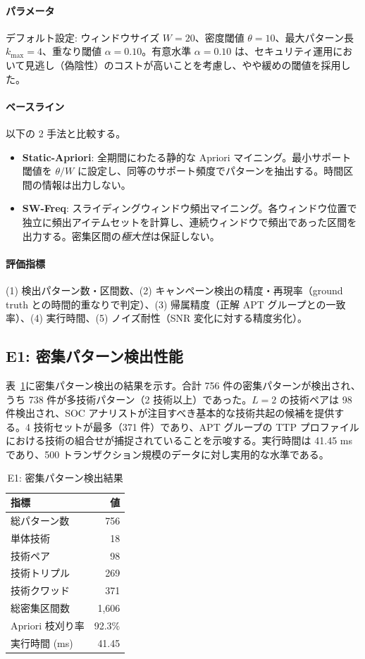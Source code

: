 \documentclass[11pt]{article}
\begin{document}
\paragraph{パラメータ}
デフォルト設定: ウィンドウサイズ $W = 20$、密度閾値 $\theta = 10$、最大パターン長 $k_{\max} = 4$、重なり閾値 $\alpha = 0.10$。有意水準 $\alpha = 0.10$ は、セキュリティ運用において見逃し（偽陰性）のコストが高いことを考慮し、やや緩めの閾値を採用した。

\paragraph{ベースライン}
以下の 2 手法と比較する。
\begin{itemize}
    \item \textbf{Static-Apriori}: 全期間にわたる静的な Apriori マイニング。最小サポート閾値を $\theta / W$ に設定し、同等のサポート頻度でパターンを抽出する。時間区間の情報は出力しない。
    \item \textbf{SW-Freq}: スライディングウィンドウ頻出マイニング。各ウィンドウ位置で独立に頻出アイテムセットを計算し、連続ウィンドウで頻出であった区間を出力する。密集区間の\emph{極大性}は保証しない。
\end{itemize}

\paragraph{評価指標}
(1) 検出パターン数・区間数、(2) キャンペーン検出の精度・再現率（ground truth との時間的重なりで判定）、(3) 帰属精度（正解 APT グループとの一致率）、(4) 実行時間、(5) ノイズ耐性（SNR 変化に対する精度劣化）。

\subsection{E1: 密集パターン検出性能}

表~\ref{tab:e1}に密集パターン検出の結果を示す。合計 756 件の密集パターンが検出され、うち 738 件が多技術パターン（2 技術以上）であった。$L=2$ の技術ペアは 98 件検出され、SOC アナリストが注目すべき基本的な技術共起の候補を提供する。4 技術セットが最多（371 件）であり、APT グループの TTP プロファイルにおける技術の組合せが捕捉されていることを示唆する。実行時間は 41.45 ms であり、500 トランザクション規模のデータに対し実用的な水準である。

\begin{table}[t]
\centering
\caption{E1: 密集パターン検出結果}
\label{tab:e1}
\begin{tabular}{lr}
\toprule
指標 & 値 \\
\midrule
総パターン数 & 756 \\
\quad 単体技術 & 18 \\
\quad 2 技術ペア & 98 \\
\quad 3 技術トリプル & 269 \\
\quad 4 技術クワッド & 371 \\
総密集区間数 & 1{,}606 \\
Apriori 枝刈り率 & 92.3\% \\
実行時間 (ms) & 41.45 \\
\bottomrule
\end{tabular}
\end{table}
\end{document}
